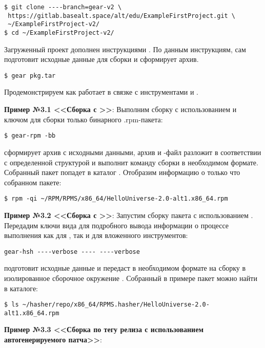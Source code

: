 \begin{verbatim}
$ git clone ----branch=gear-v2 \
 https://gitlab.basealt.space/alt/edu/ExampleFirstProject.git \
 ~/ExampleFirstProject-v2/
$ cd ~/ExampleFirstProject-v2/
\end{verbatim}

Загруженный проект дополнен  инструкциями . По данным инструкциям,
 сам подготовит исходные данные для сборки и сформирует архив.
\begin{verbatim}
$ gear pkg.tar
\end{verbatim}

Продемонстрируем как  работает в связке с инструментами 
и .

\textbf{Пример №3.1 <<Сборка с >>}:
Выполним сборку с использованием  и ключом 
для сборки только бинарного {.rpm}-пакета:
\begin{verbatim}
$ gear-rpm -bb
\end{verbatim}

 сформирует архив с исходными данными, архив и -файл разложит в
соответствии с определенной структурой и выполнит команду сборки в необходимом формате.
Собранный пакет попадет в каталог \Sys{~/RPM/RPMS/}. Отобразим информацию
о только что собранном пакете:
\begin{verbatim}
$ rpm -qi ~/RPM/RPMS/x86_64/HelloUniverse-2.0-alt1.x86_64.rpm
\end{verbatim}

\textbf{Пример №3.2 <<Сборка с >>}:
Запустим сборку пакета с использованием . Передадим ключи вида
\Sys{----verbose ---- ----verbose} для подробного вывода информации о процессе выполнения
как для \Sys{gear}, так и для вложенного \Sys{Hasher} инструментов:
\begin{verbatim}
gear-hsh ----verbose ---- ----verbose
\end{verbatim}

 подготовит исходные данные и передаст в необходимом формате на сборку в
изолированное сборочное окружение .
Собранный в примере пакет можно найти в каталоге:
\begin{verbatim}
$ ls ~/hasher/repo/x86_64/RPMS.hasher/HelloUniverse-2.0-alt1.x86_64.rpm
\end{verbatim}

\textbf{Пример №3.3 <<Сборка по тегу релиза с использованием автогенерируемого патча>>}:

